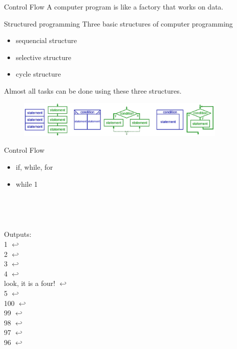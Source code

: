 \begin{frame}{Control Flow}
A computer program is like a factory that works on data. 
\begin{block}{Structured programming}
Three basic structures of computer programming
\begin{itemize}
\item sequencial structure
\item selective structure
\item cycle structure
\end{itemize}
Almost all tasks can be done using these three structures.
\end{block}
\begin{figure}
	\centering
	\includegraphics[width=0.9\textwidth]{pic/structure.png}
\end{figure}
\end{frame}

\begin{frame}{Control Flow}
\begin{itemize}
\item if, while, for
\item while 1
\end{itemize}
\begin{minipage}{0.05\textwidth}
~\\
\end{minipage}
\begin{minipage}{0.5\textwidth}

\end{minipage}
\begin{minipage}{0.05\textwidth}
~\\
\end{minipage}
\begin{minipage}{0.35\textwidth}
Outputs: \\
1 $\hookleftarrow$ \\
2 $\hookleftarrow$ \\
3 $\hookleftarrow$ \\
4 $\hookleftarrow$ \\
look, it is a four! $\hookleftarrow$ \\
5 $\hookleftarrow$ \\
100 $\hookleftarrow$ \\
99 $\hookleftarrow$ \\
98 $\hookleftarrow$ \\
97 $\hookleftarrow$ \\
96 $\hookleftarrow$ \\
\end{minipage}
\end{frame}

